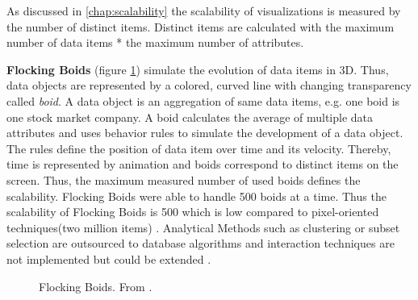 As discussed in \ref{chap:scalability} the scalability of visualizations is measured by the number of distinct items. Distinct items are calculated with the maximum number of data items * the maximum number of attributes. 

\textbf{Flocking Boids} (figure \ref{fig:flockingboids}) simulate the evolution of data items in 3D. Thus, data objects are represented by a colored, curved line with changing transparency called \textit{boid}.  A data object is an aggregation of same data items, e.g. one boid is one stock market company. A boid calculates the average of multiple data attributes and uses behavior rules to simulate the development of a data object. The rules define the position of data item over time and its velocity. Thereby, time is represented by animation and boids correspond to distinct items on the screen. Thus, the maximum measured number of used boids defines the scalability. Flocking Boids were able to handle 500 boids at a time. Thus the scalability of Flocking Boids is 500 which is low compared to pixel-oriented techniques(two million items)  \cite{Moere2004}.
Analytical Methods such as clustering or subset selection are outsourced to database algorithms and interaction techniques are not implemented but could be extended \cite{Moere2004}. 
\begin{figure}[H]
    \centering
    \caption{Flocking Boids. From  \cite{Aigner2011}.}
    \label{fig:flockingboids}
\end{figure}
